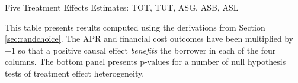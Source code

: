 \documentclass[12pt, a4paper, colorinlistoftodos]{article}
\begin{document}
\begin{table}[H]
\caption{Five Treatment Effects Estimates: TOT, TUT, ASG, ASB, ASL}
\label{tot_tut}
\begin{center}
\footnotesize{}
\end{center}
\scriptsize{This table presents results computed using the derivations from Section \ref{sec:randchoice}. The APR and financial cost outcomes have been multiplied by $-1$ so that a positive causal effect \emph{benefits} the borrower in each of the four columns. The bottom panel presents p-values for a number of null hypothesis tests of treatment effect heterogeneity. }
\end{table}







\end{document}
